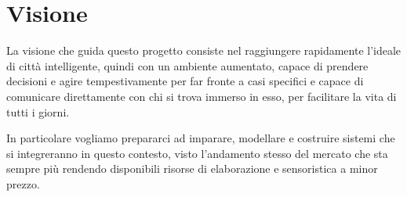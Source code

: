 \section{Visione}

La visione che guida questo progetto consiste nel raggiungere rapidamente l'ideale di città intelligente, quindi con un ambiente aumentato, capace di prendere decisioni e agire tempestivamente per far fronte a casi specifici e capace di comunicare direttamente con chi si trova immerso in esso, per facilitare la vita di tutti i giorni. 

In particolare vogliamo prepararci ad imparare, modellare e costruire sistemi che si integreranno in questo contesto, visto l'andamento stesso del mercato che sta sempre più rendendo disponibili risorse di elaborazione e sensoristica a minor prezzo.
